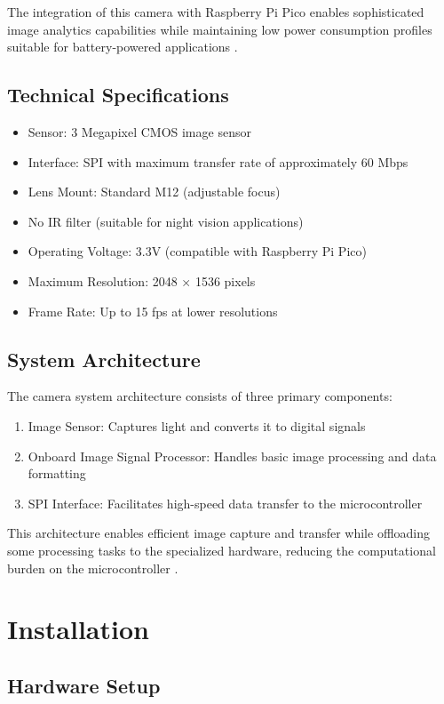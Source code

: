 The integration of this camera with Raspberry Pi Pico enables sophisticated image analytics capabilities while maintaining low power consumption profiles suitable for battery-powered applications \cite{Arducam:2023}.

\subsection{Technical Specifications}
\begin{itemize}
	\item Sensor: 3 Megapixel CMOS image sensor
	\item Interface: SPI with maximum transfer rate of approximately 60 Mbps
	\item Lens Mount: Standard M12 (adjustable focus)
	\item No IR filter (suitable for night vision applications)
	\item Operating Voltage: 3.3V (compatible with Raspberry Pi Pico)
	\item Maximum Resolution: 2048 × 1536 pixels
	\item Frame Rate: Up to 15 fps at lower resolutions
\end{itemize}

\subsection{System Architecture}
The camera system architecture consists of three primary components:
\begin{enumerate}
	\item Image Sensor: Captures light and converts it to digital signals
	\item Onboard Image Signal Processor: Handles basic image processing and data formatting
	\item SPI Interface: Facilitates high-speed data transfer to the microcontroller
\end{enumerate}

This architecture enables efficient image capture and transfer while offloading some processing tasks to the specialized hardware, reducing the computational burden on the microcontroller \cite{Hagemann:2021}.

\section{Installation}
\subsection{Hardware Setup}
